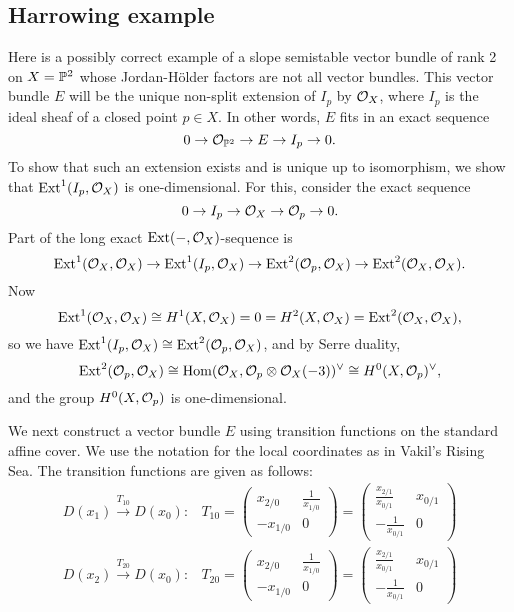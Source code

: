 \documentclass[letterpaper,10pt]{article}
\begin{document}
\subsection{Harrowing example}
Here is a possibly correct example of a slope semistable vector bundle of rank 2 on $X = \mathbb{P}^2$ whose Jordan-H\"older factors are not all vector bundles. This vector bundle $E$ will be the unique non-split extension of $I_p$ by $\mathcal{O}_X$, where $I_p$ is the ideal sheaf of a closed point $p \in X$. In other words, $E$ fits in an exact sequence
\[ 0 \to \mathcal{O}_{\mathbb{P}^2} \to E \to I_p \to 0. \]
To show that such an extension exists and is unique up to isomorphism, we show that $\mathrm{Ext}^1(I_p, \mathcal{O}_X)$ is one-dimensional. For this, consider the exact sequence
\[ 0 \to I_p \to \mathcal{O}_X \to \mathcal{O}_p \to 0. \]
Part of the long exact $\mathrm{Ext}(-, \mathcal{O}_X)$-sequence is
\[ \mathrm{Ext}^1(\mathcal{O}_X, \mathcal{O}_X) \to \mathrm{Ext}^1(I_p, \mathcal{O}_X) \to \mathrm{Ext}^2(\mathcal{O}_p, \mathcal{O}_X) \to \mathrm{Ext}^2(\mathcal{O}_X, \mathcal{O}_X). \]
Now
\[ \mathrm{Ext}^1(\mathcal{O}_X, \mathcal{O}_X) \cong H^1(X, \mathcal{O}_X) = 0 = H^2(X, \mathcal{O}_X) = \mathrm{Ext}^2(\mathcal{O}_X, \mathcal{O}_X), \]
so we have $\mathrm{Ext}^1(I_p, \mathcal{O}_X) \cong \mathrm{Ext}^2(\mathcal{O}_p, \mathcal{O}_X)$, and by Serre duality,
\[ \mathrm{Ext}^2(\mathcal{O}_p, \mathcal{O}_X) \cong \mathrm{Hom}(\mathcal{O}_X, \mathcal{O}_p \otimes \mathcal{O}_X(-3))^\vee \cong H^0(X, \mathcal{O}_p)^\vee, \]
and the group $H^0(X, \mathcal{O}_p)$ is one-dimensional.

We next construct a vector bundle $E$ using transition functions on the standard affine cover. We use the notation for the local coordinates as in Vakil's Rising Sea. The transition functions are given as follows:
\begin{align*}
    D(x_1) \xrightarrow{T_{10}} D(x_0): & T_{10} = \begin{pmatrix} x_{2/0} & \frac{1}{x_{1/0}} \\ -x_{1/0} & 0 \end{pmatrix} = \begin{pmatrix} \frac{x_{2/1}}{x_{0/1}} & x_{0/1} \\ -\frac{1}{x_{0/1}} & 0 \end{pmatrix} \\
    D(x_2) \xrightarrow{T_{20}} D(x_0): & T_{20} = \begin{pmatrix} x_{2/0} & \frac{1}{x_{1/0}} \\ -x_{1/0} & 0 \end{pmatrix} = \begin{pmatrix} \frac{x_{2/1}}{x_{0/1}} & x_{0/1} \\ -\frac{1}{x_{0/1}} & 0 \end{pmatrix} \\
\end{align*}
\end{document}

